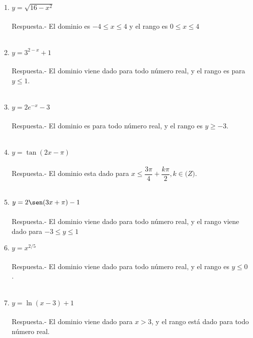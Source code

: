\begin{enumerate}
\item $y=\sqrt{16-x^2}$\\\\
    Respuesta.-\; El dominio es $-4\leq x \leq 4$ y el rango es $0\leq x \leq 4$\\\\

\item $y=3^{2-x}+1$\\\\
    Respuesta.-\; El dominio viene dado para todo número real, y el rango es para $y\leq 1$.\\\\

\item $y=2e^{-x} - 3$\\\\
    Respuesta.-\; El dominio es para todo número real, y el rango es $y\geq -3$.\\\\

\item $y=\tan(2x-\pi)$\\\\
    Respuesta.-\; El dominio esta dado para $x\leq \dfrac{3\pi}{4} + \dfrac{k\pi}{2}, k\in \mathbb(Z)$.\\\\

\item $y=2\sen(3x+\pi)-1$\\\\
    Respuesta.-\; El dominio viene dado para todo número real, y el rango viene dado para $-3\leq y \leq 1$

\item $y=x^{2/5}$\\\\
    Respuesta.-\; El dominio viene dado para todo número real, y el rango es $y\leq 0$.\\\\

\item $y=\ln(x-3)+1$\\\\
    Respuesta.-\; El dominio viene dado para $x>3$, y el rango está dado para todo número real.\\\\


\end{enumerate}
